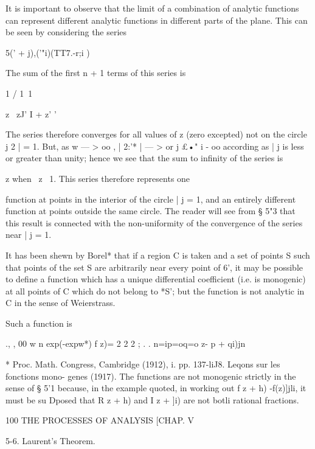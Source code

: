 {{It is important to observe that the limit of a combination of analytic 
functions can represent different analytic functions in different parts of the 
plane. This can be seen by considering the series 



5(' + j)\!,('"i)(TT7.-r;i ) 



The sum of the first n + 1 terms of this series is 

1 / 1\ 1 



z \ zJ' I + z' ' 

The series therefore converges for all values of z (zero excepted) not on the 
circle j 2  | = 1. But, as w — > oo , | 2:'*  | — > or j £•" i -  oo according as |   j is less 
or greater than unity; hence we see that the sum to infinity of the series is 

z when \ z\ <  1, and - when |   j > 1. This series therefore represents one 

function at points in the interior of the circle |   j = 1, and an entirely different 
function at points outside the same circle. The reader will see from § 5"3 
that this result is connected with the non-uniformity of the convergence of 
the series near |   j = 1. 

It has been shewn by Borel* that if a region C is taken and a set of points S such that 
points of the set S are arbitrarily near every point of 6', it may be possible to define 
a function which has a unique differential coefficient (i.e. is monogenic) at all points 
of C which do not belong to *S'; but the function is not analytic in C in the sense of 
Weierstrass. 



Such a function is 



., , 00 w n exp(-expw*) 
f z)= 2 2 2   ;   .  . 
n=ip=oq=o z- p + qi)jn 



* Proc. Math. Congress, Cambridge (1912), i. pp. 137-liJ8. Leqons sur les fonctions mono- 
genes (1917). The functions are not monogenic strictly in the sense of § 5'1 because, in the 
example quoted, in working out  f z + h) -f(z)]jli, it must be su Dposed that R z + h) and I z + ]i) 
are not botli rational fractions. 



100 THE PROCESSES OF ANALYSIS [CHAP. V 

5-6. Laurent's Theorem. 

}}
